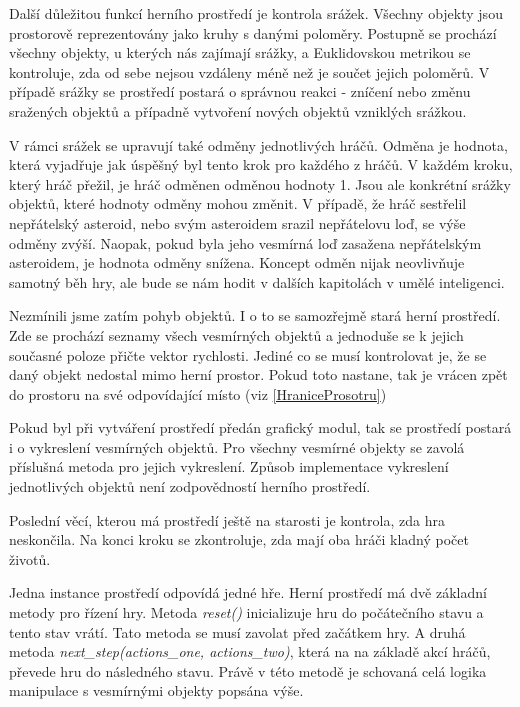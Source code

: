 \par
Další důležitou funkcí herního prostředí je kontrola srážek. Všechny objekty jsou prostorově reprezentovány jako kruhy s danými poloměry.
Postupně se prochází všechny objekty, u kterých nás zajímají srážky, a Euklidovskou metrikou se kontroluje, zda od sebe nejsou vzdáleny méně než je součet jejich poloměrů.
V případě srážky se prostředí postará o správnou reakci - zníčení nebo změnu sražených objektů a případně vytvoření nových objektů vzniklých srážkou.

\par
V rámci srážek se upravují také odměny jednotlivých hráčů. Odměna je hodnota, která vyjadřuje jak úspěšný byl tento krok pro každého z hráčů.
V každém kroku, který hráč přežil, je hráč odměnen odměnou hodnoty 1. Jsou ale konkrétní srážky objektů, které hodnoty odměny mohou změnit.
V případě, že hráč sestřelil nepřátelský asteroid, nebo svým asteroidem srazil nepřátelovu loď, se výše odměny zvýší. 
Naopak, pokud byla jeho vesmírná loď zasažena nepřátelským asteroidem, je hodnota odměny snížena. 
Koncept odměn nijak neovlivňuje samotný běh hry, ale bude se nám hodit v dalších kapitolách v umělé inteligenci.

\par
Nezmínili jsme zatím pohyb objektů. I o to se samozřejmě stará herní prostředí. 
Zde se prochází seznamy všech vesmírných objektů a jednoduše se k jejich současné poloze přičte vektor rychlosti.
Jediné co se musí kontrolovat je, že se daný objekt nedostal mimo herní prostor. Pokud toto nastane, tak je vrácen zpět do prostoru na své odpovídající místo
(viz \ref{HraniceProsotru})

\par
Pokud byl při vytváření prostředí předán grafický modul, tak se prostředí postará i o vykreslení vesmírných objektů.
Pro všechny vesmírné objekty se zavolá příslušná metoda pro jejich vykreslení. 
Způsob implementace vykreslení jednotlivých objektů není zodpovědností herního prostředí.

\par
Poslední věcí, kterou má prostředí ještě na starosti je kontrola, zda hra neskončila. Na konci kroku se zkontroluje, zda mají oba hráči kladný počet životů.

\par




Jedna instance prostředí odpovídá jedné hře. Herní prostředí má dvě základní metody pro řízení hry. 
\newline 
Metoda \emph{reset()} inicializuje hru do počátečního stavu a tento stav vrátí. Tato metoda se musí zavolat před začátkem hry.
\newline 
A druhá metoda \emph{next\_step(actions\_one, actions\_two)}, která na na základě akcí hráčů, převede hru do následného stavu.
Právě v této metodě je schovaná celá logika manipulace s vesmírnými objekty popsána výše.

